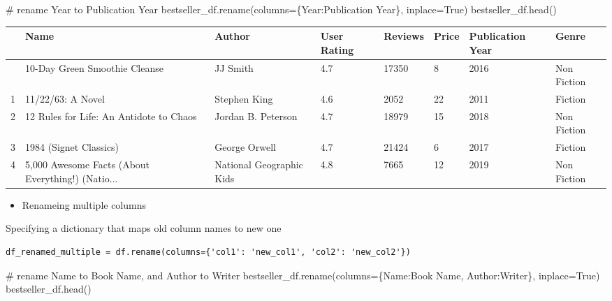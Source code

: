 \documentclass[
  letterpaper,
  DIV=11,
  numbers=noendperiod]{scrreprt}
\newenvironment{Shaded}{\begin{snugshade}}{\end{snugshade}}
\newcommand{\CommentTok}[1]{\textcolor[rgb]{0.37,0.37,0.37}{#1}}
\newcommand{\NormalTok}[1]{\textcolor[rgb]{0.00,0.23,0.31}{#1}}
\newcommand{\OperatorTok}[1]{\textcolor[rgb]{0.37,0.37,0.37}{#1}}
\newcommand{\StringTok}[1]{\textcolor[rgb]{0.13,0.47,0.30}{#1}}
\newcommand{\VariableTok}[1]{\textcolor[rgb]{0.07,0.07,0.07}{#1}}
\providecommand{\tightlist}{%
  \setlength{\itemsep}{0pt}\setlength{\parskip}{0pt}}\usepackage{longtable,booktabs,array}
\begin{document}
\begin{Shaded}
\begin{Highlighting}[]
\CommentTok{\# rename Year to Publication Year}
\NormalTok{bestseller\_df.rename(columns}\OperatorTok{=}\NormalTok{\{}\StringTok{\textquotesingle{}Year\textquotesingle{}}\NormalTok{:}\StringTok{\textquotesingle{}Publication Year\textquotesingle{}}\NormalTok{\}, inplace}\OperatorTok{=}\VariableTok{True}\NormalTok{)}
\NormalTok{bestseller\_df.head()}
\end{Highlighting}
\end{Shaded}

\begin{longtable}[]{@{}llllllll@{}}
\toprule\noalign{}
& Name & Author & User Rating & Reviews & Price & Publication Year &
Genre \\
\midrule\noalign{}
\endhead
\bottomrule\noalign{}
\endlastfoot
0 & 10-Day Green Smoothie Cleanse & JJ Smith & 4.7 & 17350 & 8 & 2016 &
Non Fiction \\
1 & 11/22/63: A Novel & Stephen King & 4.6 & 2052 & 22 & 2011 &
Fiction \\
2 & 12 Rules for Life: An Antidote to Chaos & Jordan B. Peterson & 4.7 &
18979 & 15 & 2018 & Non Fiction \\
3 & 1984 (Signet Classics) & George Orwell & 4.7 & 21424 & 6 & 2017 &
Fiction \\
4 & 5,000 Awesome Facts (About Everything!) (Natio... & National
Geographic Kids & 4.8 & 7665 & 12 & 2019 & Non Fiction \\
\end{longtable}

\begin{itemize}
\tightlist
\item
  Renameing multiple columns
\end{itemize}

Specifying a dictionary that maps old column names to new one

\begin{verbatim}
df_renamed_multiple = df.rename(columns={'col1': 'new_col1', 'col2': 'new_col2'})
\end{verbatim}

\begin{Shaded}
\begin{Highlighting}[]
\CommentTok{\# rename Name to Book Name, and Author to Writer}
\NormalTok{bestseller\_df.rename(columns}\OperatorTok{=}\NormalTok{\{}\StringTok{\textquotesingle{}Name\textquotesingle{}}\NormalTok{:}\StringTok{\textquotesingle{}Book Name\textquotesingle{}}\NormalTok{, }\StringTok{\textquotesingle{}Author\textquotesingle{}}\NormalTok{:}\StringTok{\textquotesingle{}Writer\textquotesingle{}}\NormalTok{\}, inplace}\OperatorTok{=}\VariableTok{True}\NormalTok{)}
\NormalTok{bestseller\_df.head()}
\end{Highlighting}
\end{Shaded}
\end{document}
